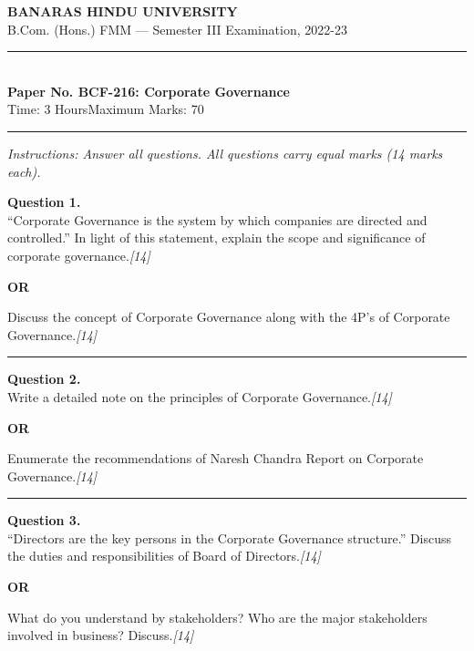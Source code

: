 \documentclass[11pt,a4paper]{article}
\newcommand{\pts}[1]{\hfill   \textit{[#1]}}
\begin{document}
\begin{center}
  {\large\bfseries BANARAS HINDU UNIVERSITY}\\[2pt]
  {\normalsize B.Com. (Hons.) FMM --- Semester III Examination, 2022-23}\\[6pt]
  \rule{0.8\linewidth}{0.5pt}\\[6pt]
  {\large\bfseries Paper No. BCF-216: Corporate Governance}\\[4pt]
  {\normalsize Time: 3 Hours\hfill Maximum Marks: 70}
\end{center}

\rule{\linewidth}{0.4pt}

\smallskip



\noindent   \textit{Instructions: Answer all questions. All questions carry equal marks (14 marks each).}

\bigskip




\noindent   \textbf{Question 1.} \\
``Corporate Governance is the system by which companies are directed and controlled.'' In light of this statement, explain the scope and significance of corporate governance.\pts{14}

\centerline{   \textbf{OR}}

Discuss the concept of Corporate Governance along with the 4P's of Corporate Governance.\pts{14}

\medskip\rule{\linewidth}{0.2pt}




\noindent   \textbf{Question 2.} \\
Write a detailed note on the principles of Corporate Governance.\pts{14}

\centerline{   \textbf{OR}}

Enumerate the recommendations of Naresh Chandra Report on Corporate Governance.\pts{14}

\medskip\rule{\linewidth}{0.2pt}




\noindent   \textbf{Question 3.} \\
``Directors are the key persons in the Corporate Governance structure.'' Discuss the duties and responsibilities of Board of Directors.\pts{14}

\centerline{   \textbf{OR}}

What do you understand by stakeholders? Who are the major stakeholders involved in business? Discuss.\pts{14}
\end{document}
